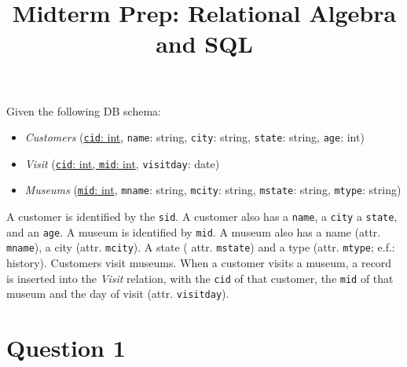 \documentclass[letterpaper, 11pt]{article}
\title{Midterm Prep: Relational Algebra and SQL}
\author{}
\date{}
\begin{document}
\maketitle

\vspace{-4em}

Given the following DB schema:
\begin{itemize}
    \item \textit{Customers} (\underline{\texttt{cid}: int}, \texttt{name}: string, \texttt{city}: string, \texttt{state}: string, \texttt{age}: int)
    \item \textit{Visit} (\underline{\texttt{cid}: int, \texttt{mid}: int}, \texttt{visitday}: date)
    \item \textit{Museums} (\underline{\texttt{mid}: int}, \texttt{mname}: string, \texttt{mcity}: string, \texttt{mstate}: string, \texttt{mtype}: string) 
\end{itemize}

A customer is identified by the \texttt{sid}. A customer also has a \texttt{name}, a \texttt{city} a \texttt{state}, and an \texttt{age}. A museum is identified by \texttt{mid}. A museum also has a name (attr. \texttt{mname}), a city (attr. \texttt{mcity}). A state ( attr. \texttt{mstate}) and a type (attr. \texttt{mtype}; e.f.: history). Customers visit museums. When a customer visits a museum, a record is inserted into the \textit{Visit} relation, with the \texttt{cid} of that customer, the \texttt{mid} of that museum and the day of visit (attr. \texttt{visitday}).

\section*{Question 1}
\end{document}
